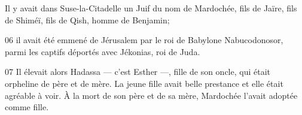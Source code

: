 Il y avait dans Suse-la-Citadelle un Juif du nom de Mardochée, fils de Jaïre, fils de Shiméï, fils de Qish, homme de Benjamin;

06 il avait été emmené de Jérusalem par le roi de Babylone Nabucodonosor, parmi les captifs déportés avec Jékonias, roi de Juda.

07 Il élevait alors Hadassa --- c’est Esther ---, fille de son oncle, qui était orpheline de père et de mère. La jeune fille avait belle prestance et elle était agréable à voir. À la mort de son père et de sa mère, Mardochée l’avait adoptée comme fille.
